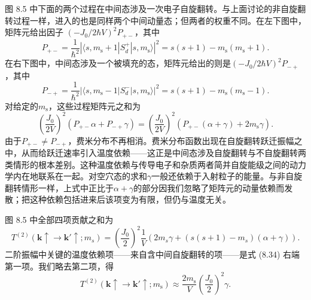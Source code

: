 图 8.5 中下面的两个过程在中间态涉及一次电子自旋翻转。与上面讨论的非自旋翻转过程一样，进入的也是同样两个中间动量态；但两者的权重不同。在左下图中，矩阵元给出因子 $(-J_0/2\hbar V)^{2}P_{+-}$，其中
\begin{equation*}
P_{+-} = \frac{1}{\hbar^2}\left|\langle s,m_{\mathrm{s}}+1|S_d^{+}|s,m_{\mathrm{s}}\rangle\right|^2 = s(s+1)-m_{\mathrm{s}}(m_{\mathrm{s}}+1).
\tag{8.31}
\end{equation*}
在右下图中，中间态涉及一个被填充的态，矩阵元给出的则是$(-J_0/2\hbar V)^2P_{-+}$，其中
\begin{equation*}
P_{-+} = \frac{1}{\hbar^2}\left|\langle s,m_{\mathrm{s}}-1|S_d^{-}|s,m_{\mathrm{s}}\rangle\right|^2 = s(s+1)-m_{\mathrm{s}}(m_{\mathrm{s}}-1).
\tag{8.32}
\end{equation*}
对给定的$m_{\mathrm{s}}$，这些过程矩阵元之和为
\begin{equation*}
\left(\frac{J_0}{2V}\right)^2(P_{+-}\alpha+P_{-+}\gamma) = \left(\frac{J_0}{2V}\right)^2\left(P_{+-}(\alpha+\gamma)+2m_{\mathrm{s}}\gamma\right).
\tag{8.33}
\end{equation*}
由于$P_{+-}\neq P_{-+}$，费米分布不再相消。费米分布函数出现在自旋翻转跃迁振幅之中，从而给跃迁速率引入温度依赖——这正是中间态涉及自旋翻转与不自旋翻转两类情形的根本差别。这种温度依赖与传导电子和杂质两者简并自旋能级之间的动力学内在地联系在一起。对空穴态的求和$\gamma$一般还依赖于入射粒子的能量。与非自旋翻转情形一样，上式中正比于$\alpha+\gamma$的部分因我们忽略了矩阵元的动量依赖而发散；把这种依赖包括进来后该项变为有限，但仍与温度无关。

图 8.5 中全部四项贡献之和为
\begin{equation*}
T^{(2)}(\mathbf{k}\uparrow\to\mathbf{k}'\uparrow;m_s) = \left(\frac{J_0}{2}\right)^2\frac{1}{V}\left(2m_s\gamma+(s(s+1)-m_s)(\alpha+\gamma)\right).
\tag{8.34}
\end{equation*}
二阶振幅中关键的温度依赖项——来自含中间自旋翻转的项——是式 (8.34) 右端第一项。我们略去第二项，得
\begin{equation*}
T^{(2)}(\mathbf{k}\uparrow\to\mathbf{k}'\uparrow;m_{\mathrm{s}}) \approx \frac{2m_{\mathrm{s}}}{V}\left(\frac{J_0}{2}\right)^2\gamma.
\tag{8.35}
\end{equation*}

